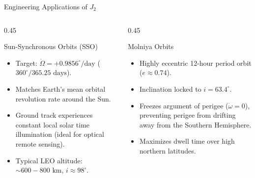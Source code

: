 \documentclass[aspectratio=169,11pt]{beamer}
\begin{document}
\begin{frame}{Engineering Applications of $J_2$}
    \begin{columns}
        \begin{column}{0.45\textwidth}
            \begin{block}{Sun-Synchronous Orbits (SSO)}
                \begin{itemize}
                    \item Target: $\dot{\Omega} = +0.9856^\circ/\text{day}$ ($360^\circ / 365.25\text{ days}$).
                    \item Matches Earth's mean orbital revolution rate around the Sun.
                    \item Ground track experiences constant local solar time illumination (ideal for optical remote sensing).
                    \item Typical LEO altitude: $\sim 600-800\text{ km}$, $i \approx 98^\circ$.
                \end{itemize}
            \end{block}
        \end{column}
        
        \begin{column}{0.45\textwidth}
            \begin{block}{Molniya Orbits}
                \begin{itemize}
                    \item Highly eccentric 12-hour period orbit ($e \approx 0.74$).
                    \item Inclination locked to $i = 63.4^\circ$.
                    \item Freezes argument of perigee ($\dot{\omega} = 0$), preventing perigee from drifting away from the Southern Hemisphere.
                    \item Maximizes dwell time over high northern latitudes.
                \end{itemize}
            \end{block}
        \end{column}
    \end{columns}
\end{frame}
\end{document}
